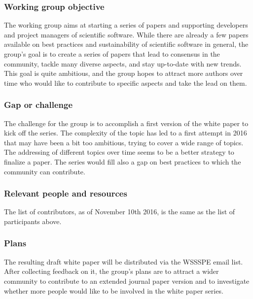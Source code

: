 \subsubsection{Working group objective}


The working group aims at starting a series of papers and supporting developers and project managers of scientific software. While there are already a few papers available on best practices and sustainability of scientific software in general, the group's goal is to create a series of papers that lead to consensus in the community, tackle many diverse aspects, and stay up-to-date with new trends. This goal is quite ambitious, and the group hopes to attract more authors over time who would like to contribute to specific aspects and take the lead on them. 

\subsubsection{Gap or challenge}

The challenge for the group is to accomplish a first version of the white paper to kick off the series. The complexity of the topic has led to a first attempt in 2016 that may have been a bit too ambitious, trying to cover a wide range of topics. The addressing of different topics over time seems to be a better strategy to finalize a paper. The series would fill also a gap on best practices to which the community can contribute.

\subsubsection{Relevant people and resources}

The list of contributors, as of November 10th 2016, is the same as the list of participants above.

\subsubsection{Plans}

The resulting draft white paper will be distributed via the WSSSPE email list. After collecting feedback on it, the group's plans are to attract a wider community to contribute to an extended journal paper version and to investigate whether more people would like to be involved in the white paper series.

